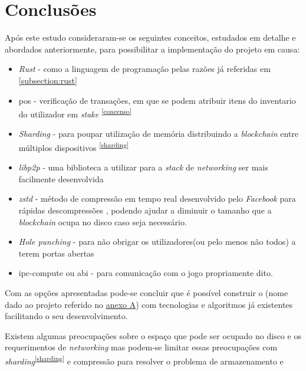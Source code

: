\newpage
\section{Conclusões}
\label{sec:blockchain_conclusao}
Após este estudo consideraram-se os seguintes conceitos, estudados em detalhe e abordados anteriormente, para possibilitar a implementação do projeto em causa:

\begin{itemize}

      \item
            \textit{Rust} - como a linguagem de programação pelas razões já referidas em \ref{subsection:rust}

      \item
            \acrshort{pos} - verificação de transações, em que se podem atribuir itens do inventario do utilizador em \textit{stake} \textsuperscript{\ref{concenso}}
      \item
            \textit{Sharding} - para poupar utilização de memória distribuindo a \textit{blockchain} entre múltiplos dispositivos
            \textsuperscript{\ref{sharding}}

      \item
            \textit{libp2p} - uma biblioteca a utilizar para a \textit{stack} de \textit{networking} ser mais facilmente desenvolvida

      \item
            \textit{zstd} - método de compressão em tempo real desenvolvido pelo \textit{Facebook} para rápidas descompressões \cite{zstd_github}, podendo ajudar a diminuir o tamanho que a \textit{blockchain} ocupa no disco caso seja necessário.
      \item
            \textit{Hole punching} - para não obrigar os utilizadores(ou pelo menos não todos) a terem portas abertas 

      \item
            \acrshort{ipc-compute} ou \acrshort{abi} - para comunicação com o jogo propriamente dito.

\end{itemize}

Com as opções apresentadas pode-se concluir que é possível construir o \gamechaining{} (nome dado ao projeto referido no \hyperref[anexo:A]{anexo A}) com tecnologias e algoritmos já existentes facilitando o seu desenvolvimento. 

Existem algumas preocupações sobre o espaço que pode ser ocupado no disco e os requerimentos de \textit{networking} mas podem-se limitar essas preocupações com \textit{sharding}\textsuperscript{\ref{sharding}} e compressão para resolver o problema de armazenamento e 

